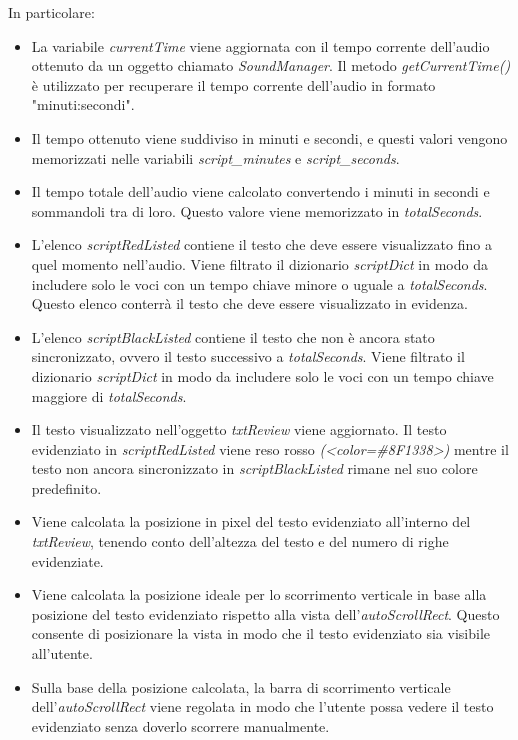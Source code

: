 \begin{itemize}
In particolare:
	\begin{itemize}
		\item La variabile \textit{currentTime} viene aggiornata con il tempo corrente dell'audio ottenuto da un oggetto chiamato \textit{SoundManager}. Il metodo \textit{getCurrentTime()} è utilizzato per recuperare il tempo corrente dell'audio in formato "minuti:secondi".
		\item Il tempo ottenuto viene suddiviso in minuti e secondi, e questi valori vengono memorizzati nelle variabili \textit{script\_minutes} e \textit{script\_seconds}.
		\item Il tempo totale dell'audio viene calcolato convertendo i minuti in secondi e sommandoli tra di loro. Questo valore viene memorizzato in \textit{totalSeconds}.
		\item L'elenco \textit{scriptRedListed} contiene il testo che deve essere visualizzato fino a quel momento nell'audio. Viene filtrato il dizionario \textit{scriptDict} in modo da includere solo le voci con un tempo chiave minore o uguale a \textit{totalSeconds}. Questo elenco conterrà il testo che deve essere visualizzato in evidenza.
		\item L'elenco \textit{scriptBlackListed} contiene il testo che non è ancora stato sincronizzato, ovvero il testo successivo a \textit{totalSeconds}. Viene filtrato il dizionario \textit{scriptDict} in modo da includere solo le voci con un tempo chiave maggiore di \textit{totalSeconds}.
		\item Il testo visualizzato nell'oggetto \textit{txtReview} viene aggiornato. Il testo evidenziato in \textit{scriptRedListed} viene reso rosso \textit{(<color=\#8F1338>)} mentre il testo non ancora sincronizzato in \textit{scriptBlackListed} rimane nel suo colore predefinito.
		\item Viene calcolata la posizione in pixel del testo evidenziato all'interno del \textit{txtReview}, tenendo conto dell'altezza del testo e del numero di righe evidenziate.
		\item Viene calcolata la posizione ideale per lo scorrimento verticale in base alla posizione del testo evidenziato rispetto alla vista dell'\textit{autoScrollRect}. Questo consente di posizionare la vista in modo che il testo evidenziato sia visibile all'utente.
		\item Sulla base della posizione calcolata, la barra di scorrimento verticale dell'\textit{autoScroll\allowbreak{}Rect} viene regolata in modo che l'utente possa vedere il testo evidenziato senza doverlo scorrere manualmente.
	\end{itemize}
\end{itemize}


